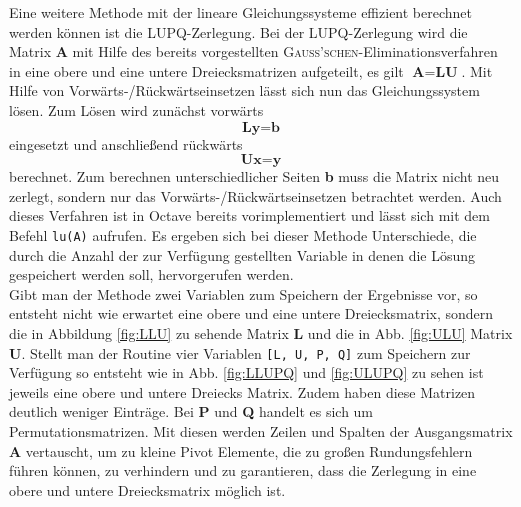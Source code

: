 Eine weitere Methode mit der lineare Gleichungssysteme effizient berechnet werden können ist die LUPQ-Zerlegung. Bei der LUPQ-Zerlegung wird die Matrix \textbf{A} mit Hilfe des bereits vorgestellten \textsc{Gauss'schen}-Eliminationsverfahren in eine obere und eine untere Dreiecksmatrizen aufgeteilt, es gilt $\textbf{A} = \textbf{L} \textbf{U}$. Mit Hilfe von Vorwärts-/Rückwärtseinsetzen lässt sich nun das Gleichungssystem lösen. Zum Lösen wird zunächst vorwärts $$ \textbf{Ly} = \textbf{b}$$ eingesetzt und anschließend rückwärts $$ \textbf{Ux} = \textbf{y}$$ berechnet. Zum berechnen unterschiedlicher Seiten \textbf{b} muss die Matrix nicht neu zerlegt, sondern nur das Vorwärts-/Rückwärtseinsetzen betrachtet werden. Auch dieses Verfahren ist in Octave bereits vorimplementiert und lässt sich mit dem Befehl \texttt{lu(A)} aufrufen. Es ergeben sich bei dieser Methode Unterschiede, die durch die Anzahl der zur Verfügung gestellten Variable in denen die Lösung gespeichert werden soll, hervorgerufen werden.\\
Gibt man der Methode zwei Variablen zum Speichern der Ergebnisse vor, so entsteht nicht wie erwartet eine obere und eine untere Dreiecksmatrix, sondern die in Abbildung \ref{fig:LLU} zu sehende Matrix \textbf{L} und die in Abb. \ref{fig:ULU} Matrix \textbf{U}. Stellt man der Routine vier Variablen \texttt{[L, U, P, Q]} zum Speichern zur Verfügung so entsteht wie in Abb. \ref{fig:LLUPQ} und \ref{fig:ULUPQ} zu sehen ist jeweils eine obere und untere Dreiecks Matrix. Zudem haben diese Matrizen deutlich weniger Einträge. Bei \textbf{P} und \textbf{Q} handelt es sich um Permutationsmatrizen. Mit diesen werden Zeilen und Spalten der Ausgangsmatrix \textbf{A} vertauscht, um zu kleine Pivot Elemente, die zu großen Rundungsfehlern führen können, zu verhindern und zu garantieren, dass die Zerlegung in eine obere und untere Dreiecksmatrix möglich ist. 

